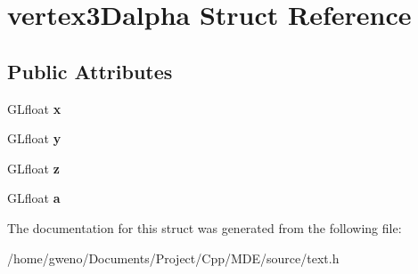 \hypertarget{structvertex3Dalpha}{}\section{vertex3\+Dalpha Struct Reference}
\label{structvertex3Dalpha}
\subsection*{Public Attributes}
\begin{DoxyCompactItemize}
\item 
G\+Lfloat {\bfseries x}\hypertarget{structvertex3Dalpha_a8489fc01621c69cd2938642f162ba2a3}{}\label{structvertex3Dalpha_a8489fc01621c69cd2938642f162ba2a3}

\item 
G\+Lfloat {\bfseries y}\hypertarget{structvertex3Dalpha_a301509568713188aab0968f9c676a2d3}{}\label{structvertex3Dalpha_a301509568713188aab0968f9c676a2d3}

\item 
G\+Lfloat {\bfseries z}\hypertarget{structvertex3Dalpha_a9a572cc5be6038cc538598972f6441ab}{}\label{structvertex3Dalpha_a9a572cc5be6038cc538598972f6441ab}

\item 
G\+Lfloat {\bfseries a}\hypertarget{structvertex3Dalpha_a83dd75199f88c8900b4996b3e0858684}{}\label{structvertex3Dalpha_a83dd75199f88c8900b4996b3e0858684}

\end{DoxyCompactItemize}


The documentation for this struct was generated from the following file\+:\begin{DoxyCompactItemize}
\item 
/home/gweno/\+Documents/\+Project/\+Cpp/\+M\+D\+E/source/text.\+h\end{DoxyCompactItemize}
